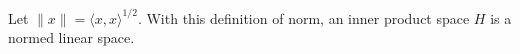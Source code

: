 Let $\|x\| = \langle x, x \rangle^{1/2}$. With this definition of norm, an inner product space $H$ is a normed linear space.
